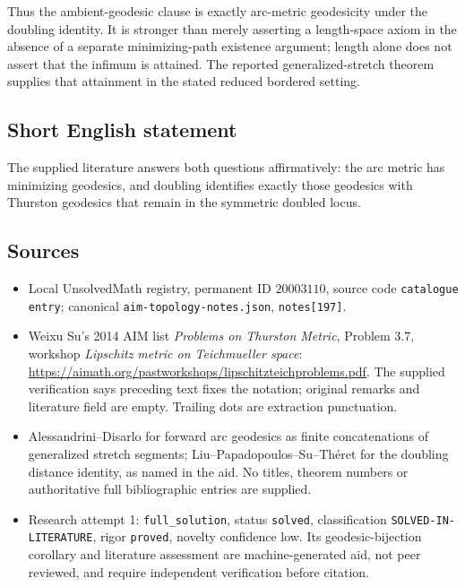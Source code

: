 \documentclass[11pt]{article}
\begin{document}
Thus the ambient-geodesic clause is exactly arc-metric geodesicity under the doubling identity. It is stronger than merely asserting a length-space axiom in the absence of a separate minimizing-path existence argument; length alone does not assert that the infimum is attained. The reported generalized-stretch theorem supplies that attainment in the stated reduced bordered setting.
\subsection{Short English statement}
The supplied literature answers both questions affirmatively: the arc metric has minimizing geodesics, and doubling identifies exactly those geodesics with Thurston geodesics that remain in the symmetric doubled locus.
\subsection{Sources}
\begin{itemize}
\item Local UnsolvedMath registry, permanent ID $20003110$, source code \texttt{catalogue entry}; canonical \texttt{aim-topology-notes.json}, \texttt{notes[197]}.
\item Weixu Su's 2014 AIM list \emph{Problems on Thurston Metric}, Problem 3.7, workshop \emph{Lipschitz metric on Teichmueller space}: \url{https://aimath.org/pastworkshops/lipschitzteichproblems.pdf}. The supplied verification says preceding text fixes the notation; original remarks and literature field are empty. Trailing dots are extraction punctuation.
\item Alessandrini--Disarlo for forward arc geodesics as finite concatenations of generalized stretch segments; Liu--Papadopoulos--Su--Th\'eret for the doubling distance identity, as named in the aid. No titles, theorem numbers or authoritative full bibliographic entries are supplied.
\item Research attempt 1: \texttt{full\_solution}, status \texttt{solved}, classification \texttt{SOLVED-IN-LITERATURE}, rigor \texttt{proved}, novelty confidence low. Its geodesic-bijection corollary and literature assessment are machine-generated aid, not peer reviewed, and require independent verification before citation.
\end{itemize}
\end{document}
